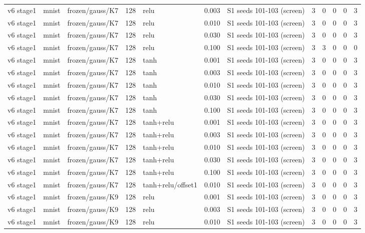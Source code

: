 \begin{table}[htbp]
{\begin{tabular}{@{}lllrlrlrrrrr@{}}
v6 stage1 & mnist & frozen/gauss/K7 & 128 & relu & 0.003 & S1 seeds 101-103 (screen) & 3 & 0 & 0 & 0 & 3 \\
v6 stage1 & mnist & frozen/gauss/K7 & 128 & relu & 0.010 & S1 seeds 101-103 (screen) & 3 & 0 & 0 & 0 & 3 \\
v6 stage1 & mnist & frozen/gauss/K7 & 128 & relu & 0.030 & S1 seeds 101-103 (screen) & 3 & 0 & 0 & 0 & 3 \\
v6 stage1 & mnist & frozen/gauss/K7 & 128 & relu & 0.100 & S1 seeds 101-103 (screen) & 3 & 3 & 0 & 0 & 0 \\
v6 stage1 & mnist & frozen/gauss/K7 & 128 & tanh & 0.001 & S1 seeds 101-103 (screen) & 3 & 0 & 0 & 0 & 3 \\
v6 stage1 & mnist & frozen/gauss/K7 & 128 & tanh & 0.003 & S1 seeds 101-103 (screen) & 3 & 0 & 0 & 0 & 3 \\
v6 stage1 & mnist & frozen/gauss/K7 & 128 & tanh & 0.010 & S1 seeds 101-103 (screen) & 3 & 0 & 0 & 0 & 3 \\
v6 stage1 & mnist & frozen/gauss/K7 & 128 & tanh & 0.030 & S1 seeds 101-103 (screen) & 3 & 0 & 0 & 0 & 3 \\
v6 stage1 & mnist & frozen/gauss/K7 & 128 & tanh & 0.100 & S1 seeds 101-103 (screen) & 3 & 0 & 0 & 0 & 3 \\
v6 stage1 & mnist & frozen/gauss/K7 & 128 & tanh+relu & 0.001 & S1 seeds 101-103 (screen) & 3 & 0 & 0 & 0 & 3 \\
v6 stage1 & mnist & frozen/gauss/K7 & 128 & tanh+relu & 0.003 & S1 seeds 101-103 (screen) & 3 & 0 & 0 & 0 & 3 \\
v6 stage1 & mnist & frozen/gauss/K7 & 128 & tanh+relu & 0.010 & S1 seeds 101-103 (screen) & 3 & 0 & 0 & 0 & 3 \\
v6 stage1 & mnist & frozen/gauss/K7 & 128 & tanh+relu & 0.030 & S1 seeds 101-103 (screen) & 3 & 0 & 0 & 0 & 3 \\
v6 stage1 & mnist & frozen/gauss/K7 & 128 & tanh+relu & 0.100 & S1 seeds 101-103 (screen) & 3 & 0 & 0 & 0 & 3 \\
v6 stage1 & mnist & frozen/gauss/K7 & 128 & tanh+relu/offset1 & 0.010 & S1 seeds 101-103 (screen) & 3 & 0 & 0 & 0 & 3 \\
v6 stage1 & mnist & frozen/gauss/K9 & 128 & relu & 0.001 & S1 seeds 101-103 (screen) & 3 & 0 & 0 & 0 & 3 \\
v6 stage1 & mnist & frozen/gauss/K9 & 128 & relu & 0.003 & S1 seeds 101-103 (screen) & 3 & 0 & 0 & 0 & 3 \\
v6 stage1 & mnist & frozen/gauss/K9 & 128 & relu & 0.010 & S1 seeds 101-103 (screen) & 3 & 0 & 0 & 0 & 3 \\

\end{tabular}}
\end{table}
